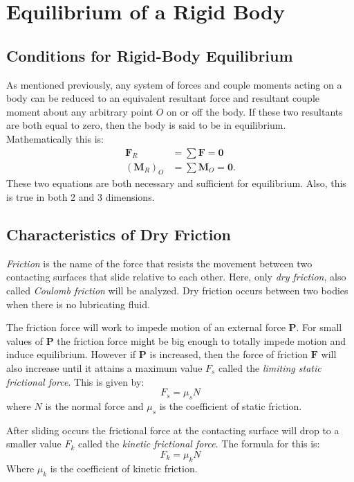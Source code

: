 
\section{Equilibrium of a Rigid Body}

\subsection{Conditions for Rigid-Body Equilibrium}
As mentioned previously, any system of forces and couple moments acting on a body can be reduced to an equivalent resultant force and resultant couple moment about any arbitrary point $O$ on or off the body. If these two resultants are both equal to zero, then the body is said to be in equilibrium. Mathematically this is:
\begin{align*}
  \textbf{F}_R &= \sum \textbf{F} = \textbf{0} \\
  \left( \textbf{M}_R\right)_O &= \sum \textbf{M}_O = \textbf{0}
.\end{align*}
These two equations are both necessary and sufficient for equilibrium. Also, this is true in both 2 and 3 dimensions.


\subsection{Characteristics of Dry Friction}
\textit{Friction} is the name of the force that resists the movement between two contacting surfaces that slide relative to each other. Here, only \textit{dry friction}, also called \textit{Coulomb friction} will be analyzed. Dry friction occurs between two bodies when there is no lubricating fluid. 

The friction force will work to impede motion of an external force $\textbf{P}$. For small values of $\textbf{P}$ the friction force might be big enough to totally impede motion and induce equilibrium. However if $\textbf{P}$ is increased, then the force of friction $\textbf{F}$ will also increase until it attains a maximum value $F_s$ called the \textit{limiting static frictional force}. This is given by:
\[ 
F_s = \mu_s N
\]
where $N$ is the normal force and $\mu_s$ is the coefficient of static friction. 

After sliding occurs the frictional force at the contacting surface will drop to a smaller value $F_k$ called the \textit{kinetic frictional force}. The formula for this is:
\[ 
F_k = \mu_k N
\]
Where $\mu_k$ is the coefficient of kinetic friction.
